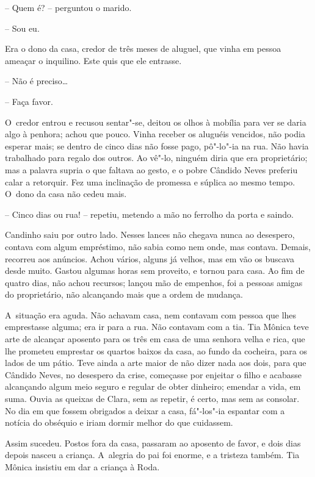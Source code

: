 -- Quem é? -- perguntou o marido.

-- Sou eu.

Era o dono da casa, credor de três meses de aluguel, que vinha em pessoa
ameaçar o inquilino. Este quis que ele entrasse.

-- Não é preciso\ldots{}

-- Faça favor.

O~credor entrou e recusou sentar"-se, deitou os olhos à mobília para ver
se daria algo à penhora; achou que pouco. Vinha receber os aluguéis
vencidos, não podia esperar mais; se dentro de cinco dias não fosse
pago, pô"-lo"-ia na rua. Não havia trabalhado para regalo dos outros. Ao
vê"-lo, ninguém diria que era proprietário; mas a palavra supria o que
faltava ao gesto, e o pobre Cândido Neves preferiu calar a retorquir.
Fez uma inclinação de promessa e súplica ao mesmo tempo. O~dono da casa
não cedeu mais.

-- Cinco dias ou rua! -- repetiu, metendo a mão no ferrolho da porta e
saindo.

Candinho saiu por outro lado. Nesses lances não chegava nunca ao
desespero, contava com algum empréstimo, não sabia como nem onde, mas
contava. Demais, recorreu aos anúncios. Achou vários, alguns já velhos,
mas em vão os buscava desde muito. Gastou algumas horas sem proveito, e
tornou para casa. Ao fim de quatro dias, não achou recursos; lançou mão
de empenhos, foi a pessoas amigas do proprietário, não alcançando mais
que a ordem de mudança.

A~situação era aguda. Não achavam casa, nem contavam com pessoa que lhes
emprestasse alguma; era ir para a rua. Não contavam com a tia. Tia
Mônica teve arte de alcançar aposento para os três em casa de uma
senhora velha e rica, que lhe prometeu emprestar os quartos baixos da
casa, ao fundo da cocheira, para os lados de um pátio. Teve ainda a arte
maior de não dizer nada aos dois, para que Cândido Neves, no desespero
da crise, começasse por enjeitar o filho e acabasse alcançando algum
meio seguro e regular de obter dinheiro; emendar a vida, em suma. Ouvia
as queixas de Clara, sem as repetir, é certo, mas sem as consolar. No
dia em que fossem obrigados a deixar a casa, fá"-los"-ia espantar com a
notícia do obséquio e iriam dormir melhor do que cuidassem.

Assim sucedeu. Postos fora da casa, passaram ao aposento de favor, e
dois dias depois nasceu a criança. A~alegria do pai foi enorme, e a
tristeza também. Tia Mônica insistiu em dar a criança à Roda.

